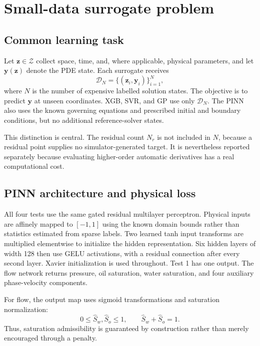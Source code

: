 \section{Small-data surrogate problem}
\label{sec:method}

\subsection{Common learning task}

Let \(\boldsymbol z\in\mathcal Z\) collect space, time, and, where applicable, physical parameters, and let \(\boldsymbol y(\boldsymbol z)\) denote the PDE state. Each surrogate receives
\begin{equation}
    \mathcal D_N=\{(\boldsymbol z_i,\boldsymbol y_i)\}_{i=1}^{N},
\end{equation}
where \(N\) is the number of expensive labelled solution states. The objective is to predict \(\boldsymbol y\) at unseen coordinates. XGB, SVR, and GP use only \(\mathcal D_N\). The PINN also uses the known governing equations and prescribed initial and boundary conditions, but no additional reference-solver states.

This distinction is central. The residual count \(N_r\) is not included in \(N\), because a residual point supplies no simulator-generated target. It is nevertheless reported separately because evaluating higher-order automatic derivatives has a real computational cost.

\subsection{PINN architecture and physical loss}

All four tests use the same gated residual multilayer perceptron. Physical inputs are affinely mapped to \([-1,1]\) using the known domain bounds rather than statistics estimated from sparse labels. Two learned tanh input transforms are multiplied elementwise to initialize the hidden representation. Six hidden layers of width 128 then use GELU activations, with a residual connection after every second layer. Xavier initialization is used throughout. Test 1 has one output. The flow network returns pressure, oil saturation, water saturation, and four auxiliary phase-velocity components.

For flow, the output map uses sigmoid transformations and saturation normalization:
\begin{equation}
    0\le \widehat S_w,\widehat S_o\le 1,
    \qquad \widehat S_w+\widehat S_o=1 .
\end{equation}
Thus, saturation admissibility is guaranteed by construction rather than merely encouraged through a penalty.

